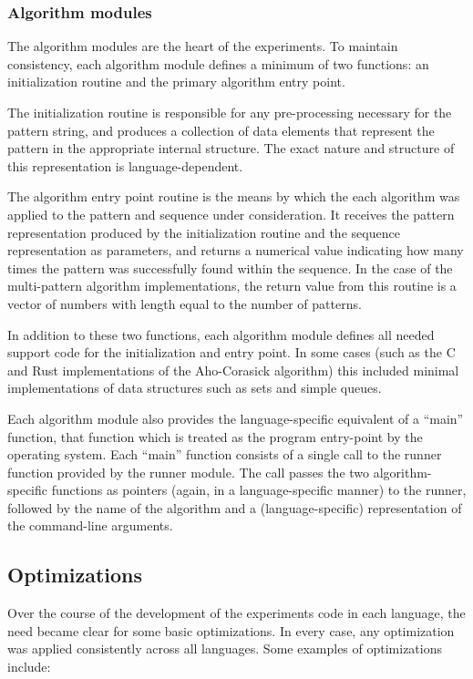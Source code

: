\subsubsection{Algorithm modules}

The algorithm modules are the heart of the experiments. To maintain consistency, each algorithm module defines a minimum of two functions: an initialization routine and the primary algorithm entry point.

The initialization routine is responsible for any pre-processing necessary for the pattern string, and produces a collection of data elements that represent the pattern in the appropriate internal structure. The exact nature and structure of this representation is language-dependent.

The algorithm entry point routine is the means by which the each algorithm was applied to the pattern and sequence under consideration. It receives the pattern representation produced by the initialization routine and the sequence representation as parameters, and returns a numerical value indicating how many times the pattern was successfully found within the sequence. In the case of the multi-pattern algorithm implementations, the return value from this routine is a vector of numbers with length equal to the number of patterns.

In addition to these two functions, each algorithm module defines all needed support code for the initialization and entry point. In some cases (such as the C and Rust implementations of the Aho-Corasick algorithm) this included minimal implementations of data structures such as sets and simple queues.

Each algorithm module also provides the language-specific equivalent of a ``main'' function, that function which is treated as the program entry-point by the operating system. Each ``main'' function consists of a single call to the runner function provided by the runner module. The call passes the two algorithm-specific functions as pointers (again, in a language-specific manner) to the runner, followed by the name of the algorithm and a (language-specific) representation of the command-line arguments.

\subsection{Optimizations}

Over the course of the development of the experiments code in each language, the need became clear for some basic optimizations. In every case, any optimization was applied consistently across all languages. Some examples of optimizations include:

